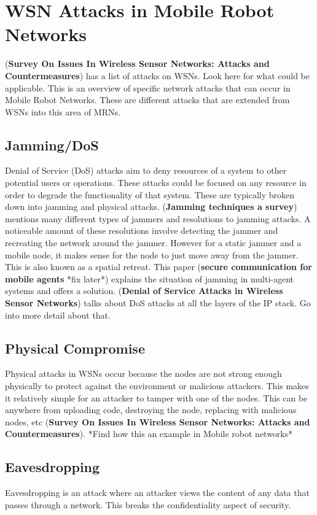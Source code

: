 \section{WSN Attacks in Mobile Robot Networks}
(\textbf{Survey On Issues In Wireless Sensor Networks: Attacks and Countermeasures}) has a list of attacks on WSNs. Look here for what could be applicable. \newline
This is an overview of specific network attacks that can occur in Mobile Robot Networks. These are different attacks that are extended from WSNs into this area of MRNs.
\subsection{Jamming/DoS}
Denial of Service (DoS) attacks aim to deny resources of a system to other potential users or operations. These attacks could be focused on any resource in order to degrade the functionality of that system. These are typically broken down into jamming and physical attacks. \newline
(\textbf{Jamming techniques a survey}) mentions many different types of jammers and resolutions to jamming attacks. A noticeable amount of these resolutions involve detecting the jammer and recreating the network around the jammer. However for a static jammer and a mobile node, it makes sense for the node to just move away from the jammer. This is also known as a spatial retreat. This paper (\textbf{secure communication for mobile agents} *fix later*) explains the situation of jamming in multi-agent systems and offers a solution. \newline
(\textbf{Denial of Service Attacks in Wireless Sensor Networks}) talks about DoS attacks at all the layers of the IP stack. Go into more detail about that. 
\subsection{Physical Compromise}
Physical attacks in WSNs occur because the nodes are not strong enough physically to protect against the environment or malicious attackers. This makes it relatively simple for an attacker to tamper with one of the nodes. This can be anywhere from uploading code, destroying the node, replacing with malicious nodes, etc (\textbf{Survey On Issues In Wireless Sensor Networks: Attacks and Countermeasures}). *Find how this an example in Mobile robot networks* 
\subsection{Eavesdropping}
Eavesdropping is an attack where an attacker views the content of any data that passes through a network. This breaks the confidentiality aspect of security. 
